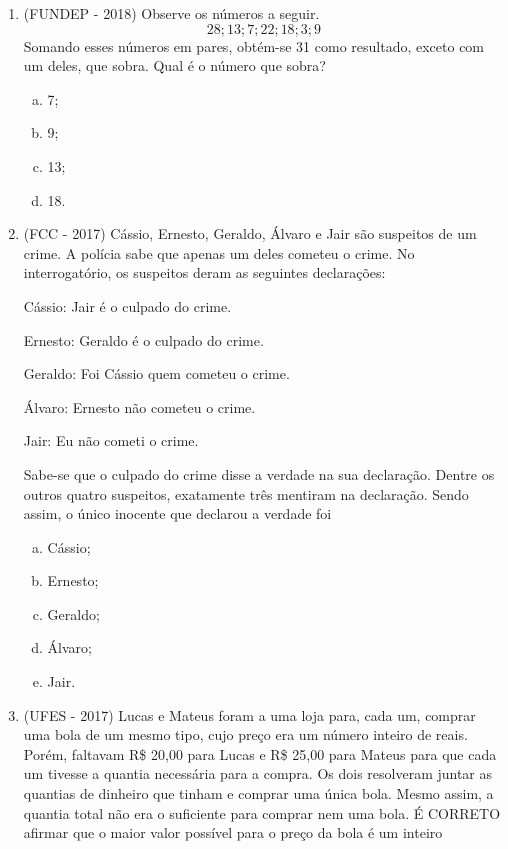 \begin{enumerate}
\item (FUNDEP - 2018) Observe os números a seguir.
\[28; 13; 7; 22; 18; 3; 9 \]
Somando esses números em pares, obtém-se 31 como resultado, exceto com um deles, que sobra. Qual é o número que sobra?
\begin{multicols}{4}
\begin{enumerate}[a)]
\item 7;
\item 9;
\item 13;
\item 18.
\end{enumerate}
\end{multicols}

\item (FCC - 2017) Cássio, Ernesto, Geraldo, Álvaro e Jair são suspeitos de um crime. A polícia sabe que apenas um deles cometeu o crime. No interrogatório, os suspeitos deram as seguintes declarações:


Cássio: Jair é o culpado do crime.

Ernesto: Geraldo é o culpado do crime.

Geraldo: Foi Cássio quem cometeu o crime.

Álvaro: Ernesto não cometeu o crime.

Jair: Eu não cometi o crime.


Sabe-se que o culpado do crime disse a verdade na sua declaração. Dentre os outros quatro suspeitos, exatamente três mentiram na declaração. Sendo assim, o único inocente que declarou a verdade foi
\begin{multicols}{2}
\begin{enumerate}[a)]
\item Cássio;
\item Ernesto;
\item Geraldo;
\item Álvaro;
\item Jair.
\end{enumerate}
\end{multicols}

\item (UFES - 2017) Lucas e Mateus foram a uma loja para, cada um, comprar uma bola de um mesmo tipo, cujo preço era um número inteiro de reais. Porém, faltavam R\$ 20,00 para Lucas e R\$ 25,00 para Mateus para que cada um tivesse a quantia necessária para a compra. Os dois resolveram juntar as quantias de dinheiro que tinham e comprar uma única bola. Mesmo assim, a quantia total não era o suficiente para comprar nem uma bola. É CORRETO afirmar que o maior valor possível para o preço da bola é um inteiro


\end{enumerate}
